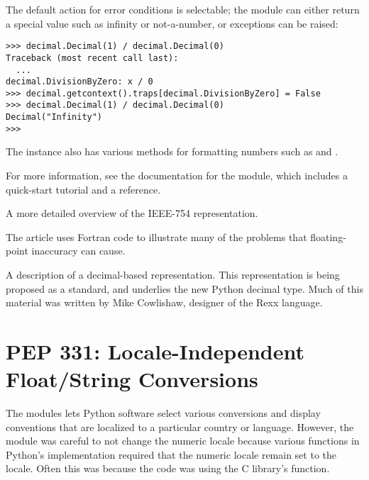 \documentclass{howto}
\begin{document}
The default action for error conditions is selectable; the module can
either return a special value such as infinity or not-a-number, or
exceptions can be raised:

\begin{verbatim}
>>> decimal.Decimal(1) / decimal.Decimal(0)
Traceback (most recent call last):
  ...
decimal.DivisionByZero: x / 0
>>> decimal.getcontext().traps[decimal.DivisionByZero] = False
>>> decimal.Decimal(1) / decimal.Decimal(0)
Decimal("Infinity")
>>> 
\end{verbatim}

The  instance also has various methods for formatting 
numbers such as  and .

For more information, see the documentation for the 
module, which includes a quick-start tutorial and a reference.

\begin{seealso}

{A more detailed overview of the IEEE-754 representation.}

{The article uses Fortran code to illustrate many of the problems
that floating-point inaccuracy can cause.}

{A description of a decimal-based representation.  This representation
is being proposed as a standard, and underlies the new Python decimal
type.  Much of this material was written by Mike Cowlishaw, designer of the
Rexx language.}

\end{seealso}      


\section{PEP 331: Locale-Independent Float/String Conversions}

The  modules lets Python software select various
conversions and display conventions that are localized to a particular
country or language.  However, the module was careful to not change
the numeric locale because various functions in Python's
implementation required that the numeric locale remain set to the
 locale.  Often this was because the code was using the C library's
 function.  
\end{document}
